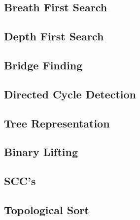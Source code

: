 \documentclass[11pt, letterpaper]{article}
\begin{document}
\subsection{Breath First Search}


\subsection{Depth First Search}


\subsection{Bridge Finding}


\subsection{Directed Cycle Detection}


\subsection{Tree Representation}


\subsection{Binary Lifting}


\subsection{SCC's}


% 

\subsection{Topological Sort}

\end{document}
